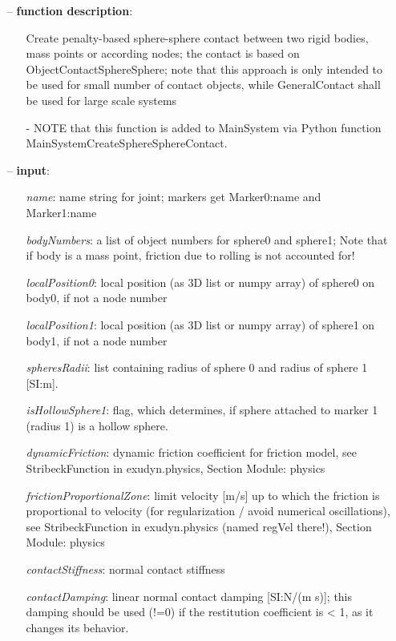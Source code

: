 \begin{itemize}[leftmargin=0.7cm]
\item[--]
{\bf function description}: \vspace{-6pt}
\begin{itemize}[leftmargin=1.2cm]
\setlength{\itemindent}{-0.7cm}
\item[]Create penalty-based sphere-sphere contact between two rigid bodies, mass points or according nodes; the contact is based on ObjectContactSphereSphere; note that this approach is only intended to be used for small number of contact objects, while GeneralContact shall be used for large scale systems
\item[]- NOTE that this function is added to MainSystem via Python function MainSystemCreateSphereSphereContact.
\end{itemize}
\item[--]
{\bf input}: \vspace{-6pt}
\begin{itemize}[leftmargin=1.2cm]
\setlength{\itemindent}{-0.7cm}
\item[]{\it name}: name string for joint; markers get Marker0:name and Marker1:name
\item[]{\it bodyNumbers}: a list of object numbers for sphere0 and sphere1; Note that if body is a mass point, friction due to rolling is not accounted for!
\item[]{\it localPosition0}: local position (as 3D list or numpy array) of sphere0 on body0, if not a node number
\item[]{\it localPosition1}: local position (as 3D list or numpy array) of sphere1 on body1, if not a node number
\item[]{\it spheresRadii}: list containing radius of sphere 0 and radius of sphere 1 [SI:m].
\item[]{\it isHollowSphere1}: flag, which determines, if sphere attached to marker 1 (radius 1) is a hollow sphere.
\item[]{\it dynamicFriction}: dynamic friction coefficient for friction model, see StribeckFunction in exudyn.physics, Section Module: physics
\item[]{\it frictionProportionalZone}: limit velocity [m/s] up to which the friction is proportional to velocity (for regularization / avoid numerical oscillations), see StribeckFunction in exudyn.physics (named regVel there!), Section Module: physics
\item[]{\it contactStiffness}: normal contact stiffness
\item[]{\it contactDamping}: linear normal contact damping [SI:N/(m s)]; this damping should be used (!=0) if the restitution coefficient is < 1, as it changes its behavior.

\end{itemize}
\end{itemize}

